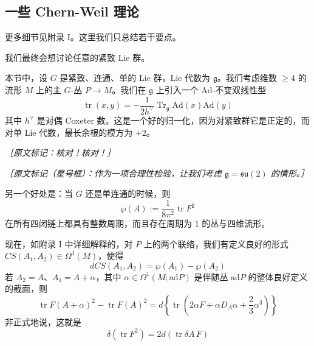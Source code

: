 \subsection{一些 Chern-Weil 理论} %

更多细节见附录 I。这里我们只总结若干要点。

我们最终会想讨论任意的紧致 Lie 群。

本节中，设 $G$ 是紧致、连通、单的 Lie 群，Lie 代数为 $\mathfrak{g}$。我们考虑维数 $\ge4$ 的流形 $M$ 上的主 $G$-丛 $P\to M$。我们在 $\mathfrak{g}$ 上引入一个 $\mathrm{Ad}$-不变双线性型
\begin{equation}
  \operatorname{tr}(x,y)=-\frac{1}{2h^\vee}\operatorname{Tr}_{\mathfrak{g}}\mathrm{Ad}(x)\mathrm{Ad}(y)
  \tag{3.1}
  \label{eq:3.1}
\end{equation}
其中 $h^\vee$ 是对偶 Coxeter 数。这是一个好的归一化，因为对紧致群它是正定的，而对单 Lie 代数，最长余根的模方为 $+2$。

{\small\itshape ［原文标记：核对！核对！］}

{\small\itshape ［原文标记（星号框）：作为一项合理性检验，让我们考虑 $\mathfrak{g}=\mathfrak{su}(2)$ 的情形。］}

另一个好处是：当 $G$ 还是单连通的时候，则
\begin{equation}
  \wp(A):=\frac{1}{8\pi^2}\operatorname{tr}F^2
  \tag{3.2}
  \label{eq:3.2}
\end{equation}
在所有四闭链上都具有整数周期，而且存在周期为 $1$ 的丛与四维流形。

现在，如附录 I 中详细解释的，对 $P$ 上的两个联络，我们有定义良好的形式 $CS(A_1,A_2)\in\Omega^3(M)$，使得
\begin{equation}
  dCS(A_1,A_2)=\wp(A_1)-\wp(A_2)
  \tag{3.3}
  \label{eq:3.3}
\end{equation}
若 $A_2=A$、$A_1=A+\alpha$，其中 $\alpha\in\Omega^1(M;\mathrm{ad}P)$ 是伴随丛 $\mathrm{ad}P$ 的整体良好定义的截面，则
\begin{equation}
  \operatorname{tr}F(A+\alpha)^2-\operatorname{tr}F(A)^2
  =d\left\{\operatorname{tr}\left(2\alpha F+\alpha D_A\alpha+\frac23\alpha^3\right)\right\}
  \tag{3.4}
  \label{eq:3.4}
\end{equation}
非正式地说，这就是
\begin{equation}
  \delta\left(\operatorname{tr}F^2\right)=2d\left(\operatorname{tr}\delta A\,F\right)
  \tag{3.5}
  \label{eq:3.5}
\end{equation}

